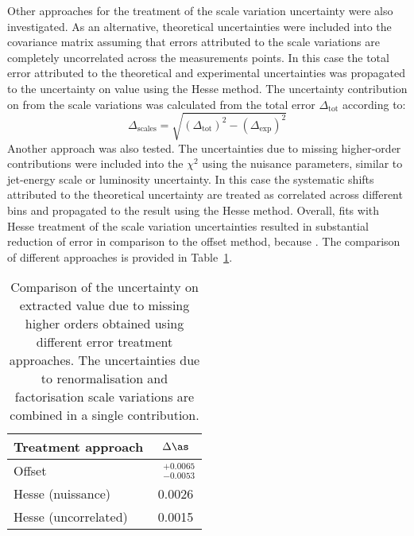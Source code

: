 Other approaches for the treatment of the scale variation uncertainty were also investigated. As an alternative, theoretical uncertainties were included into the covariance matrix assuming that errors attributed to the scale variations are completely uncorrelated across the measurements points. In this case the total error attributed to the theoretical and experimental uncertainties was propagated to the uncertainty on \asz value using the Hesse method. The uncertainty contribution on \as from the scale variations was calculated from the total error $\Delta_\text{tot}$ according to:
\begin{equation}
 \Delta_\text{scales} = \sqrt{\left(\Delta_\text{tot}\right)^2 - \left(\Delta_\text{exp}\right)^2}
 \label{eq:asuncscalecontrib}
\end{equation}
Another approach was also tested. The uncertainties due to missing higher-order contributions were included into the $\chi^2$ using the nuisance parameters, similar to jet-energy scale or luminosity uncertainty. In this case the systematic shifts attributed to the theoretical uncertainty are treated as correlated across different bins and propagated to the result using the Hesse method. Overall, fits with Hesse treatment of the scale variation uncertainties resulted in substantial reduction of \asz error in comparison to the offset method, because . The comparison of different approaches is provided in Table~\ref{tab:scaleuncvariants}.
\begin{table}[h]
\centering
\begin{tabular}{|l|c|}
 \hline
 Treatment approach & $\Delta\as$ \\
 \hline
 \hline
  Offset & $\phantom{x}^{+0.0065}_{-0.0053}$\\
  Hesse (nuissance) & 0.0026 \\
  Hesse (uncorrelated) & 0.0015 \\
 \hline
\end{tabular}
\caption{Comparison of the uncertainty on extracted \asz value due to missing higher orders obtained using different error treatment approaches. The uncertainties due to renormalisation and factorisation scale variations are combined in a single contribution.}
\label{tab:scaleuncvariants}
\end{table}

